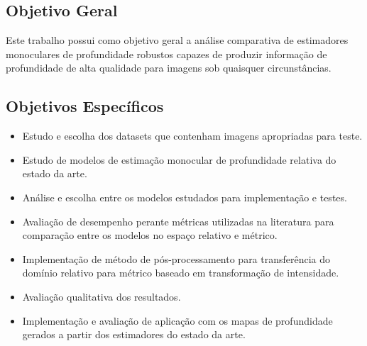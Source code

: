 \subsection{Objetivo Geral}
Este trabalho possui como objetivo geral a análise comparativa de estimadores monoculares de profundidade robustos capazes de produzir informação de profundidade de alta qualidade para imagens sob quaisquer circunstâncias.

\subsection{Objetivos Específicos}

\begin{itemize}
    \item Estudo e escolha dos datasets que contenham imagens apropriadas para teste.
    \item Estudo de modelos de estimação monocular de profundidade relativa do estado da arte.
    \item Análise e escolha entre os modelos estudados para implementação e testes.
    \item Avaliação de desempenho perante métricas utilizadas na literatura para comparação entre os modelos no espaço relativo e métrico.
    \item Implementação de método de pós-processamento para transferência do domínio relativo para métrico baseado em transformação de intensidade.
    \item Avaliação qualitativa dos resultados.
    \item Implementação e avaliação de aplicação com os mapas de profundidade gerados a partir dos estimadores do estado da arte.
    
\end{itemize}

